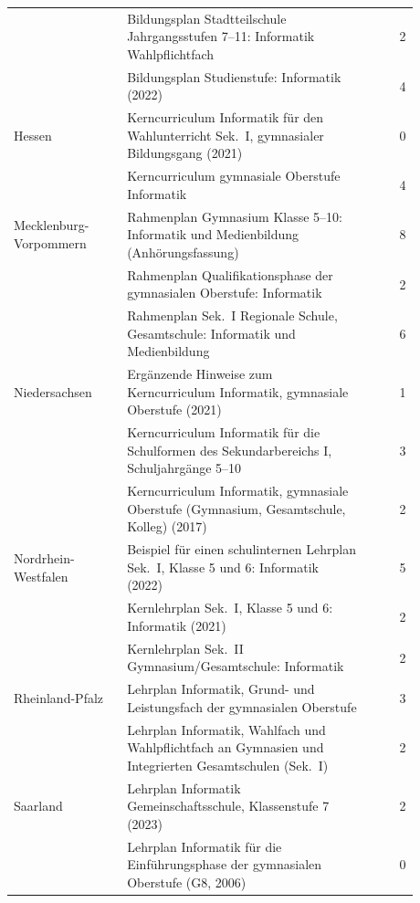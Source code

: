 \begin{longtable}{@{}p{0.28\linewidth}p{0.6\linewidth}r@{}}
 & Bildungsplan Stadtteilschule Jahrgangsstufen 7--11: Informatik Wahlpflichtfach \parencite{FHH2014} & 2 \\
 & Bildungsplan Studienstufe: Informatik (2022) \parencite{FHH2022} & 4 \\
Hessen & Kerncurriculum Informatik für den Wahlunterricht Sek.\ I, gymnasialer Bildungsgang (2021) \parencite{HessischesKultusministerium2021} & 0 \\
 & Kerncurriculum gymnasiale Oberstufe Informatik \parencite{HessischesKultusministerium} & 4 \\
Mecklenburg-Vorpommern & Rahmenplan Gymnasium Klasse 5--10: Informatik und Medienbildung (Anhörungsfassung) \parencite{MBWK2019c} & 8 \\
 & Rahmenplan Qualifikationsphase der gymnasialen Oberstufe: Informatik \parencite{MBWK2019a} & 2 \\
 & Rahmenplan Sek.\ I Regionale Schule, Gesamtschule: Informatik und Medienbildung \parencite{MBWK2019b} & 6 \\
Niedersachsen & Ergänzende Hinweise zum Kerncurriculum Informatik, gymnasiale Oberstufe (2021) \parencite{NKM2021} & 1 \\
 & Kerncurriculum Informatik für die Schulformen des Sekundarbereichs I, Schuljahrgänge 5--10 \parencite{Borstelmann2014} & 3 \\
 & Kerncurriculum Informatik, gymnasiale Oberstufe (Gymnasium, Gesamtschule, Kolleg) (2017) \parencite{Beckmann2017} & 2 \\
Nordrhein-Westfalen & Beispiel für einen schulinternen Lehrplan Sek.\ I, Klasse 5 und 6: Informatik (2022) \parencite{QUALiS2022} & 5 \\
 & Kernlehrplan Sek.\ I, Klasse 5 und 6: Informatik (2021) \parencite{NRW562021} & 2 \\
 & Kernlehrplan Sek.\ II Gymnasium/Gesamtschule: Informatik \parencite{NRW2014} & 2 \\
Rheinland-Pfalz & Lehrplan Informatik, Grund- und Leistungsfach der gymnasialen Oberstufe \parencite{RLPSekII} & 3 \\
 & Lehrplan Informatik, Wahlfach und Wahlpflichtfach an Gymnasien und Integrierten Gesamtschulen (Sek.\ I) \parencite{RLPSekI} & 2 \\
Saarland & Lehrplan Informatik Gemeinschaftsschule, Klassenstufe 7 (2023) \parencite{Saarland2023b} & 2 \\
 & Lehrplan Informatik für die Einführungsphase der gymnasialen Oberstufe (G8, 2006) \parencite{Saarland2006} & 0 \\

\end{longtable}
